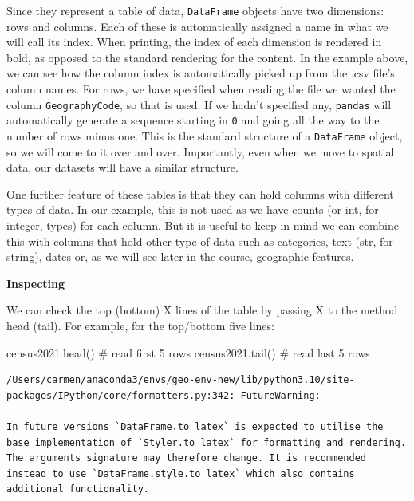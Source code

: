 \documentclass[
  letterpaper,
  DIV=11,
  numbers=noendperiod]{scrreprt}
\newenvironment{Shaded}{\begin{snugshade}}{\end{snugshade}}
\newcommand{\CommentTok}[1]{\textcolor[rgb]{0.37,0.37,0.37}{#1}}
\newcommand{\NormalTok}[1]{\textcolor[rgb]{0.00,0.23,0.31}{#1}}
\begin{document}
Since they represent a table of data, \texttt{DataFrame} objects have
two dimensions: rows and columns. Each of these is automatically
assigned a name in what we will call its index. When printing, the index
of each dimension is rendered in bold, as opposed to the standard
rendering for the content. In the example above, we can see how the
column index is automatically picked up from the .csv file's column
names. For rows, we have specified when reading the file we wanted the
column \texttt{GeographyCode}, so that is used. If we hadn't specified
any, \texttt{pandas} will automatically generate a sequence starting in
\texttt{0} and going all the way to the number of rows minus one. This
is the standard structure of a \texttt{DataFrame} object, so we will
come to it over and over. Importantly, even when we move to spatial
data, our datasets will have a similar structure.

One further feature of these tables is that they can hold columns with
different types of data. In our example, this is not used as we have
counts (or int, for integer, types) for each column. But it is useful to
keep in mind we can combine this with columns that hold other type of
data such as categories, text (str, for string), dates or, as we will
see later in the course, geographic features.

\textbf{Inspecting}

We can check the top (bottom) X lines of the table by passing X to the
method head (tail). For example, for the top/bottom five lines:

\begin{Shaded}
\begin{Highlighting}[]
\NormalTok{census2021.head() }\CommentTok{\# read first 5 rows}
\NormalTok{census2021.tail() }\CommentTok{\# read last 5 rows}
\end{Highlighting}
\end{Shaded}

\begin{verbatim}
/Users/carmen/anaconda3/envs/geo-env-new/lib/python3.10/site-packages/IPython/core/formatters.py:342: FutureWarning:

In future versions `DataFrame.to_latex` is expected to utilise the base implementation of `Styler.to_latex` for formatting and rendering. The arguments signature may therefore change. It is recommended instead to use `DataFrame.style.to_latex` which also contains additional functionality.
\end{verbatim}
\end{document}
